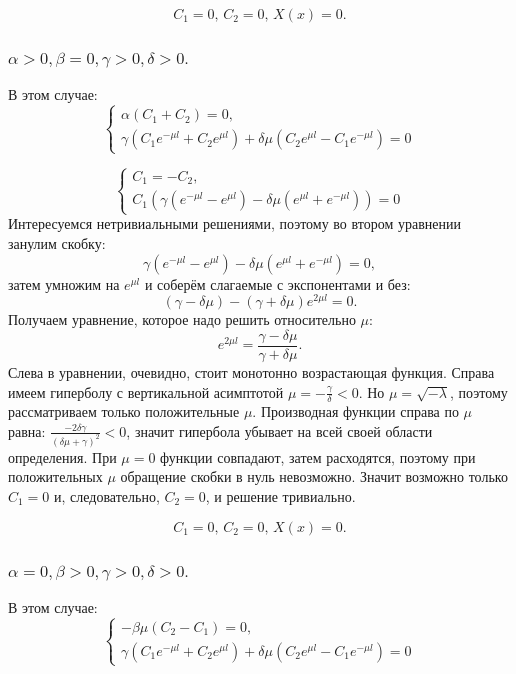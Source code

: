 \documentclass[12pt, a4paper]{report}
\begin{document}
\[ C_{1} = 0, \, C_{2} = 0, \, X(x) = 0. \]

\subsubsection{ $ \alpha > 0, \beta = 0, \gamma > 0, \delta > 0. $}
В этом случае:
\begin{displaymath}
	\begin{cases}
		\alpha (C_{1} + C_{2}) = 0, \\
		\gamma (C_{1} e^{-\mu l} + C_{2} e^{\mu l}) + \delta \mu (C_{2} e^{\mu l} - C_{1} e^{-\mu l}) = 0
	\end{cases}
\end{displaymath}

\begin{displaymath}
	\begin{cases}
		C_{1} = -C_{2}, \\
		C_{1} (\gamma (e^{-\mu l} - e^{\mu l}) - \delta \mu (e^{\mu l} + e^{-\mu l})) = 0
	\end{cases}
\end{displaymath}
Интересуемся нетривиальными решениями, поэтому во втором уравнении занулим скобку:
\[ \gamma (e^{-\mu l} - e^{\mu l}) - \delta \mu (e^{\mu l} + e^{-\mu l}) = 0, \]
затем умножим на $ e^{\mu l}$ и соберём слагаемые с экспонентами и без:
\[ (\gamma - \delta \mu) -  (\gamma + \delta \mu) e^{2 \mu l} = 0. \]
Получаем уравнение, которое надо решить относительно $\mu$:
\[ e^{2 \mu l} = \frac{\gamma - \delta \mu}{\gamma + \delta \mu}. \]
Слева в уравнении, очевидно, стоит монотонно возрастающая функция. Справа имеем гиперболу с вертикальной асимптотой $\mu = -\frac{\gamma}{\delta} < 0$. Но $\mu = \sqrt{-\lambda}$, поэтому рассматриваем только положительные $\mu$. Производная функции справа по $\mu$ равна: $\frac{-2\delta \gamma}{(\delta \mu + \gamma)^2} < 0$, значит гипербола убывает на всей своей области определения. При $\mu = 0$ функции совпадают, затем расходятся, поэтому при положительных $\mu$ обращение скобки в нуль невозможно. Значит возможно только $C_{1} = 0$ и, следовательно, $C_{2} = 0$, и решение тривиально.

\[ C_{1} = 0, \, C_{2} = 0, \, X(x) = 0. \]

\subsubsection{ $ \alpha = 0, \beta > 0, \gamma > 0, \delta > 0. $}
В этом случае: 
\begin{displaymath}
	\begin{cases}
		- \beta \mu (C_{2} - C_{1}) = 0, \\
		\gamma (C_{1} e^{-\mu l} + C_{2} e^{\mu l}) + \delta \mu (C_{2} e^{\mu l} - C_{1} e^{-\mu l}) = 0
	\end{cases}
\end{displaymath}
\end{document}
